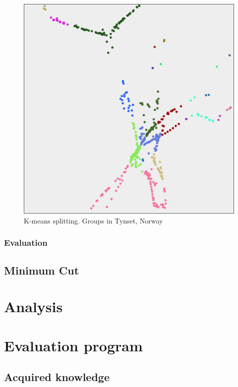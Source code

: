 \begin{figure}[h]
	\center
	\includegraphics[scale=0.35]{Images/computations/KMEANSTynset.jpg}
	\caption{K-means splitting. Groups in Tynset, Norway}
	\label{fig:kmeans_forks}
\end{figure}








\subsubsection{Evaluation}

\subsection{Minimum Cut}

\section{Analysis}
\section{Evaluation program}

\subsection{Acquired knowledge}
